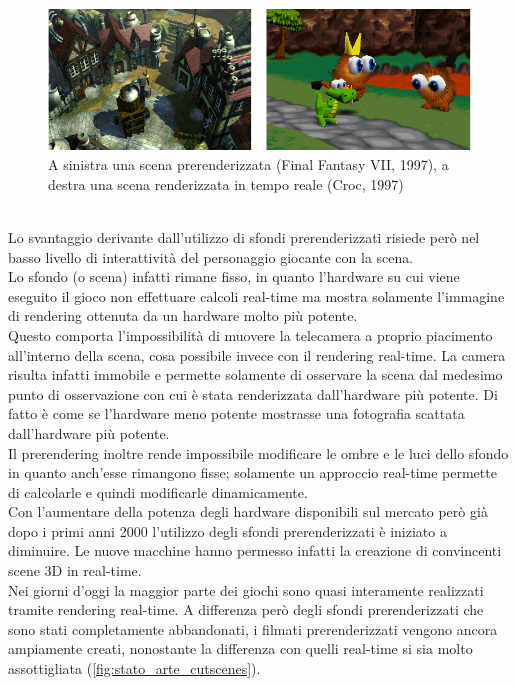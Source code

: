 \\
\begin{figure}[htb]
 \centering
 \includegraphics[width=1\linewidth]{images/chapter_stato_arte/stato_arte_croc_ffvii.png}\hfill
 \caption[Confronto tra scena prerenderizzata e real time]{A sinistra una scena prerenderizzata (Final Fantasy VII, 1997), a destra una scena renderizzata in tempo reale (Croc, 1997)}
 \label{fig:stato_arte_confronto_ffvii_croc}
\end{figure}
\\
Lo svantaggio derivante dall’utilizzo di sfondi prerenderizzati risiede però nel basso livello di interattività del personaggio giocante con la scena.
\\
Lo sfondo (o scena) infatti rimane fisso, in quanto l’hardware su cui viene eseguito il gioco non effettuare calcoli real-time ma mostra solamente l’immagine di rendering ottenuta da un hardware molto più potente.
\\
Questo comporta l’impossibilità di muovere la telecamera a proprio piacimento all’interno della scena, cosa possibile invece con il rendering real-time. La camera risulta infatti immobile e permette solamente di osservare la scena dal medesimo punto di osservazione con cui è stata renderizzata dall’hardware più potente. Di fatto è come se l’hardware meno potente mostrasse una fotografia scattata dall’hardware più potente.
\\
Il prerendering inoltre rende impossibile modificare le ombre e le luci dello sfondo in quanto anch’esse rimangono fisse; solamente un approccio real-time permette di calcolarle e quindi modificarle dinamicamente.
\\
Con l’aumentare della potenza degli hardware disponibili sul mercato però già dopo i primi anni 2000 l’utilizzo degli sfondi prerenderizzati è iniziato a diminuire. Le nuove macchine hanno permesso infatti la creazione di convincenti scene 3D in real-time.
\\ 
Nei giorni d’oggi la maggior parte dei giochi sono quasi interamente realizzati tramite rendering real-time. A differenza però degli sfondi prerenderizzati che sono stati completamente abbandonati, i filmati prerenderizzati vengono ancora ampiamente creati, nonostante la differenza con quelli real-time si sia molto assottigliata (\ref{fig:stato_arte_cutscenes}).
